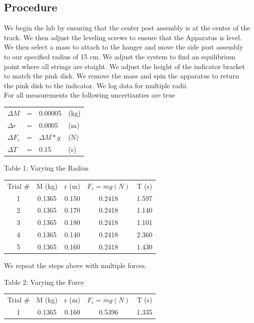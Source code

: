 \documentclass[12pt]{report}
\begin{document}
\begin{flushleft}
\begin{multicols}{2}
\section{Procedure}
We begin the lab by ensuring that the center post assembly is at the center of the track.
We then adjust the leveling screws to ensure that the Apparatus is level. We then select a mass to attach to the hanger and move the side post assembly to our specified radius of 15 cm. We adjust the system to find an equilibrium point where all strings are staight. We adjust the height of the indicator bracket to match the pink disk. We remove the mass and spin the apparatus to return the pink disk to the indicator. We log data for multiple radii.\\
For all measurements the following uncertianties are true\\
\begin{center}
\begin{tabular}{lcll}
$\Delta M$ & = & 0.00005 & (kg)\\
$\Delta r$ & = & 0.0005 & (m)\\
$\Delta F_c$ & = & $\Delta M*g$ & (N)\\
$\Delta T$ & = & 0.15 & (s)\\
\end{tabular}
\end{center}
\begin{center}
\flushleft Table 1: Varying the Radius
\footnotesize
\begin{tabular}{|c|c|c|c|c|}
\hline
Trial \# & M (kg) & r (m) & $F_c = mg (N)$ & T (s) \\
1 & 0.1365 & 0.150 & 0.2418 & 1.597 \\
2 & 0.1365 & 0.170 & 0.2418 & 1.140 \\
3 & 0.1365 & 0.180 & 0.2418 & 1.101 \\
4 & 0.1365 & 0.140 & 0.2418 & 2.360 \\
5 & 0.1365 & 0.160 & 0.2418 & 1.430 \\
\hline
\end{tabular}
\end{center}
\vspace{0.5cm}
We repeat the steps above with multiple forces.
\begin{center}
\flushleft Table 2: Varying the Force
\footnotesize
\begin{tabular}{|c|c|c|c|c|}
\hline
Trial \# & M (kg) & r (m) & $F_c = mg (N)$ & T (s) \\
1 & 0.1365 & 0.160 & 0.5396 & 1.335 \\

\end{tabular}
\end{center}
\end{multicols}
\end{flushleft}
\end{document}
